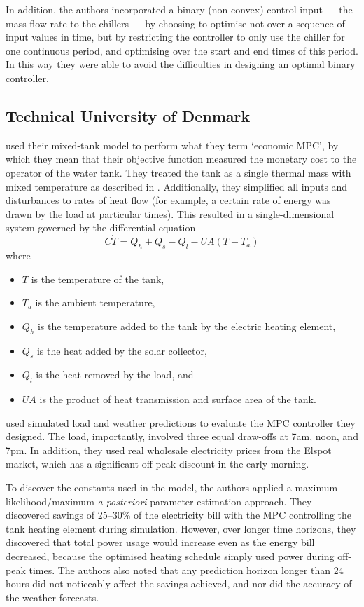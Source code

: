 In addition, the authors incorporated a binary (non-convex) control input --- the mass flow rate to the chillers --- by choosing to optimise not over a sequence of input values in time, but by restricting the controller to only use the chiller for one continuous period, and optimising over the start and end times of this period.
In this way they were able to avoid the difficulties in designing an optimal binary controller.

\subsection{Technical University of Denmark}

\textcite{Halvgaard12} used their mixed-tank model to perform what they term `economic MPC', by which they mean that their objective function measured the monetary cost to the operator of the water tank.
They treated the tank as a single thermal mass with mixed temperature as described in .
Additionally, they simplified all inputs and disturbances to rates of heat flow (for example, a certain rate of energy was drawn by the load at particular times).
This resulted in a single-dimensional system governed by the differential equation
$$ C \dot{T} = Q_h + Q_s - Q_l - U A (T - T_a) $$
where
\begin{itemize}
	\item $T$ is the temperature of the tank,
	\item $T_a$ is the ambient temperature,
	\item $Q_h$ is the temperature added to the tank by the electric heating element,
	\item $Q_s$ is the heat added by the solar collector,
	\item $Q_l$ is the heat removed by the load, and
	\item $U A$ is the product of heat transmission and surface area of the tank.
\end{itemize}

 used simulated load and weather predictions to evaluate the MPC controller they designed.
The load, importantly, involved three equal draw-offs at 7am, noon, and 7pm.
In addition, they used real wholesale electricity prices from the Elspot market, which has a significant off-peak discount in the early morning.

To discover the constants used in the model, the authors applied a maximum likelihood/maximum \emph{a posteriori} parameter estimation approach.
They discovered savings of 25--30\% of the electricity bill with the MPC controlling the tank heating element during simulation.
However, over longer time horizons, they discovered that total power usage would increase even as the energy bill decreased, because the optimised heating schedule simply used power during off-peak times.
The authors also noted that any prediction horizon longer than 24 hours did not noticeably affect the savings achieved, and nor did the accuracy of the weather forecasts.
